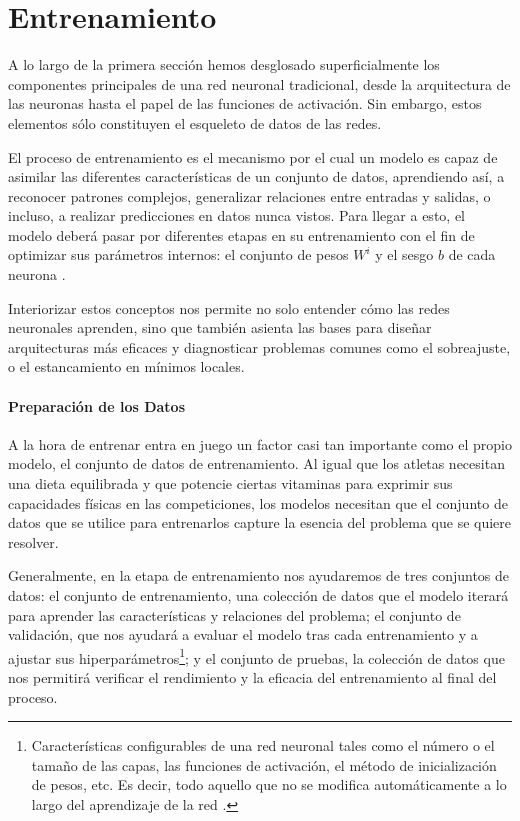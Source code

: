 \section{Entrenamiento}\label{sec:entrenamiento_rn}

A lo largo de la primera sección hemos desglosado superficialmente los componentes principales de una red neuronal tradicional, desde la arquitectura de las neuronas hasta el papel de las funciones de activación. Sin embargo, estos elementos sólo constituyen el esqueleto de datos de las redes.

El proceso de entrenamiento es el mecanismo por el cual un modelo es capaz de asimilar las diferentes características de un conjunto de datos, aprendiendo así, a reconocer patrones complejos, generalizar relaciones entre entradas y salidas, o incluso, a realizar predicciones en datos nunca vistos. Para llegar a esto, el modelo deberá pasar por diferentes etapas en su entrenamiento con el fin de optimizar sus parámetros internos: el conjunto de pesos $W^i$ y el sesgo $b$ de cada neurona \cite{dl_fundamentos__casas_roma_2020}.

Interiorizar estos conceptos nos permite no solo entender cómo las redes neuronales aprenden, sino que también asienta las bases para diseñar arquitecturas más eficaces y diagnosticar problemas comunes como el sobreajuste, o el estancamiento en mínimos locales.

\paragraph{Preparación de los Datos}

A la hora de entrenar entra en juego un factor casi tan importante como el propio modelo, el conjunto de datos de entrenamiento. Al igual que los atletas necesitan una dieta equilibrada y que potencie ciertas vitaminas para exprimir sus capacidades físicas en las competiciones, los modelos necesitan que el conjunto de datos que se utilice para entrenarlos capture la esencia del problema que se quiere resolver.

Generalmente, en la etapa de entrenamiento nos ayudaremos de tres conjuntos de datos: el conjunto de entrenamiento, una colección de datos que el modelo iterará para aprender las características y relaciones del problema; el conjunto de validación, que nos ayudará a evaluar el modelo tras cada entrenamiento y a ajustar sus hiperparámetros\footnote{Características configurables de una red neuronal tales como el número o el tamaño de las capas, las funciones de activación, el método de inicialización de pesos, etc. Es decir, todo aquello que no se modifica automáticamente a lo largo del aprendizaje de la red \cite{dl_python__chollet_2021, dl_fundamentos__casas_roma_2020}.}; y el conjunto de pruebas, la colección de datos que nos permitirá verificar el rendimiento y la eficacia del entrenamiento al final del proceso.

